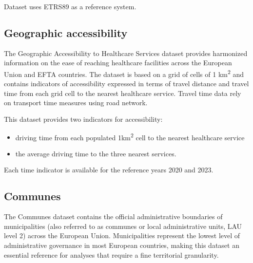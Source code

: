 Dataset uses ETRS89 as a reference system.


\subsection{Geographic accessibility}

The Geographic Accessibility to Healthcare Services dataset provides harmonized information on the ease of reaching healthcare facilities across the European Union and EFTA countries. 
The dataset is based on a grid of cells of 1 km\textsuperscript{2} and contains indicators of accessibility expressed in terms of travel distance and travel time from each grid cell to the nearest healthcare service.
Travel time data rely on transport time measures using road network.

This dataset provides two indicators for accessibility:
\begin{itemize}
	\item driving time from each populated 1km\textsuperscript{2} cell to the nearest healthcare service
	\item the average driving time to the three nearest services.
\end{itemize}

Each time indicator is available for the reference years 2020 and 2023.

\subsection{Communes}

The Communes dataset contains the official administrative boundaries of municipalities (also referred to as communes or local administrative units, LAU level 2) across the European Union. 
Municipalities represent the lowest level of administrative governance in most European countries, making this dataset an essential reference for analyses that require a fine territorial granularity.

